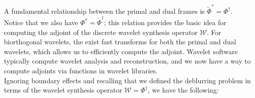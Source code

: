 \documentclass[journal]{IEEEtran}
\begin{document}
%
%
%
%
%
%
%

   \noindent A fundamental relationship between the primal and dual frames is $\tilde{\Phi}^\ast = \Phi^\dagger$.  Notice that we also have $\Phi^\ast = \tilde{\Phi}^\dagger$; this relation provides the basic idea for computing the adjoint of the discrete wavelet synthesis operator $\mathcal{W}$.  For biorthogonal wavelets, the exist fast transforms for both the primal and dual wavelets, which allows us to efficiently compute the adjoint.  Wavelet software typically compute wavelet analysis and reconstruction, and we now have a way to compute adjoints via functions in wavelet libraries.\\
   
   Ignoring boundary effects and recalling that we defined the deblurring problem in terms of the wavelet synthesis operator $\mathcal{W}=\Phi^\dagger$, we have the following:
\end{document}
